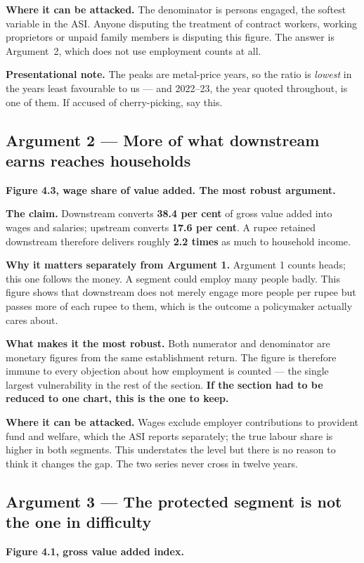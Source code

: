 \documentclass[11pt, a4paper]{article}
\begin{document}
\textbf{Where it can be attacked.} The denominator is persons engaged, the softest
variable in the ASI. Anyone disputing the treatment of contract workers, working
proprietors or unpaid family members is disputing this figure. The answer is
Argument~2, which does not use employment counts at all.

\textbf{Presentational note.} The peaks are metal-price years, so the ratio is
\emph{lowest} in the years least favourable to us --- and 2022--23, the year quoted
throughout, is one of them. If accused of cherry-picking, say this.

\subsection{Argument 2 --- More of what downstream earns reaches households}
\textbf{Figure 4.3, wage share of value added. The most robust argument.}

\textbf{The claim.} Downstream converts \textbf{38.4 per cent} of gross value added
into wages and salaries; upstream converts \textbf{17.6 per cent}. A rupee retained
downstream therefore delivers roughly \textbf{2.2 times} as much to household income.

\textbf{Why it matters separately from Argument 1.} Argument 1 counts heads;
this one follows the money. A segment could employ many people badly. This figure
shows that downstream does not merely engage more people per rupee but passes more of
each rupee to them, which is the outcome a policymaker actually cares about.

\textbf{What makes it the most robust.} Both numerator and denominator are monetary
figures from the same establishment return. The figure is therefore immune to every
objection about how employment is counted --- the single largest vulnerability in the
rest of the section. \textbf{If the section had to be reduced to one chart, this is
the one to keep.}

\textbf{Where it can be attacked.} Wages exclude employer contributions to provident
fund and welfare, which the ASI reports separately; the true labour share is higher in
both segments. This understates the level but there is no reason to think it changes
the gap. The two series never cross in twelve years.

\subsection{Argument 3 --- The protected segment is not the one in difficulty}
\textbf{Figure 4.1, gross value added index.}
\end{document}
